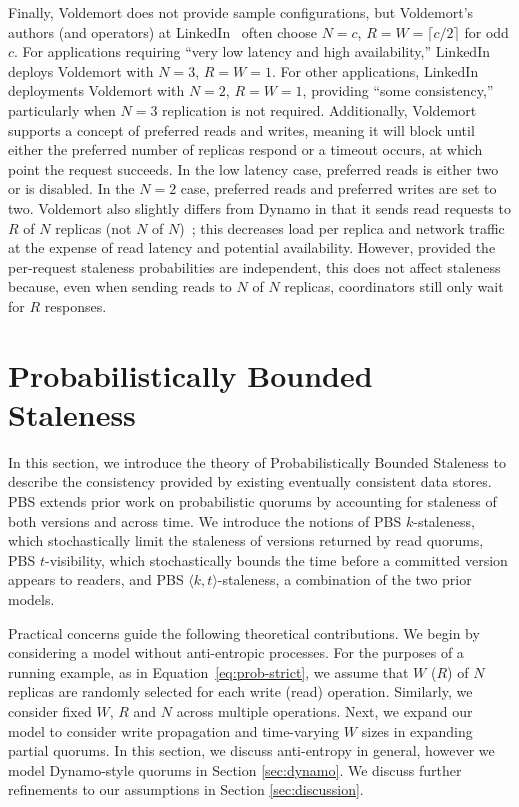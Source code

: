 \documentclass{vldb}
\begin{document}
 Finally, Voldemort does not provide sample configurations, but
 Voldemort's authors (and operators) at LinkedIn~\cite{feinbergpc}
 often choose $N$$=$$c$, $R$$=$$W$$=$$ \lceil c/2 \rceil$ for odd $c$.
 For applications requiring ``very low latency and high
 availability,'' LinkedIn deploys Voldemort with $N$$=$$3$,
 $R$$=$$W$$=$$1$.  For other applications, LinkedIn deployments
 Voldemort with $N$$=$$2$, $R$$=$$W$$=$$1$, providing ``some
 consistency,'' particularly when $N$$=$$3$ replication is not
 required.  Additionally, Voldemort supports a concept of preferred
 reads and writes, meaning it will block until either the preferred
 number of replicas respond or a timeout occurs, at which point the
 request succeeds.  In the low latency case, preferred reads is either
 two or is disabled.  In the $N$$=$$2$ case, preferred reads and
 preferred writes are set to two.  Voldemort also slightly differs
 from Dynamo in that it sends read requests to $R$ of $N$ replicas
 (not $N$ of $N$)~\cite{voldemortpub}; this decreases load per replica
 and network traffic at the expense of read latency and potential
 availability.  However, provided the per-request staleness
 probabilities are independent, this does not affect staleness
 because, even when sending reads to $N$ of $N$ replicas, coordinators
 still only wait for $R$ responses.


\section{Probabilistically Bounded\\Staleness}
\label{sec:pbs}

In this section, we introduce the theory of Probabilistically Bounded
Staleness to describe the consistency provided by existing eventually
consistent data stores.  PBS extends prior work on
probabilistic quorums by accounting for staleness of both versions and
across time.  We introduce the notions of PBS $k$-staleness, which
stochastically limit the staleness of versions returned by read
quorums, PBS $t$-visibility, which stochastically bounds the time
before a committed version appears to readers, and PBS $\langle k,
t \rangle$-staleness, a combination of the two prior models.


Practical concerns guide the following theoretical contributions.  We
begin by considering a model without anti-entropic processes.  For the
purposes of a running example, as in Equation~\ref{eq:prob-strict}, we
assume that $W$ ($R$) of $N$ replicas are randomly selected for each
write (read) operation.  Similarly, we consider fixed $W$, $R$ and $N$
across multiple operations. Next, we expand our model to consider
write propagation and time-varying $W$ sizes in expanding partial
quorums.  In this section, we discuss anti-entropy in general, however
we model Dynamo-style quorums in Section \ref{sec:dynamo}. We discuss
further refinements to our assumptions in Section
\ref{sec:discussion}.
\end{document}
